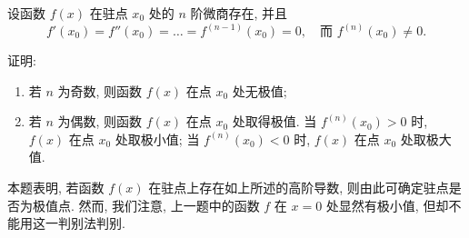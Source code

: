\begin{exercise}[3.6.11]
    设函数 $f(x)$ 在驻点 $x_0$ 处的 $n$ 阶微商存在, 并且
    $$f'(x_0) = f''(x_0) = \dots = f^{(n-1)}(x_0) = 0, \quad \text{而 } f^{(n)}(x_0) \ne 0.$$

    证明:
    \begin{enumerate}
        \item 若 $n$ 为奇数, 则函数 $f(x)$ 在点 $x_0$ 处无极值;
        \item 若 $n$ 为偶数, 则函数 $f(x)$ 在点 $x_0$ 处取得极值. 当 $f^{(n)}(x_0) > 0$ 时, $f(x)$ 在点 $x_0$ 处取极小值; 当 $f^{(n)}(x_0) < 0$ 时, $f(x)$ 在点 $x_0$ 处取极大值.
    \end{enumerate}
    本题表明, 若函数 $f(x)$ 在驻点上存在如上所述的高阶导数, 则由此可确定驻点是否为极值点. 然而, 我们注意, 上一题中的函数 $f$ 在 $x=0$ 处显然有极小值, 但却不能用这一判别法判别.
\end{exercise}

\newpage